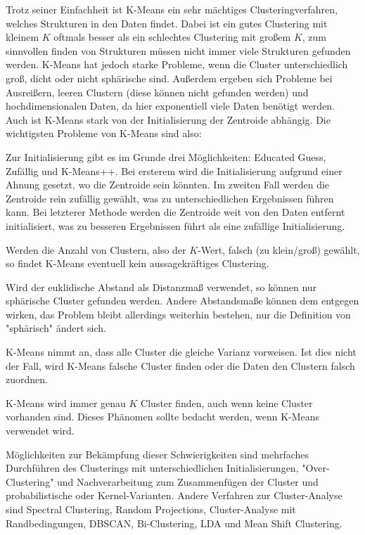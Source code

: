 		Trotz seiner Einfachheit ist K-Means ein sehr mächtiges Clusteringverfahren, welches Strukturen in den Daten findet. Dabei ist ein gutes Clustering mit kleinem \(K\) oftmals besser als ein schlechtes Clustering mit großem \(K\), \dh zum sinnvollen finden von Strukturen müssen nicht immer viele Strukturen gefunden werden. K-Means hat jedoch starke Probleme, wenn die Cluster unterschiedlich groß, dicht oder nicht sphärische sind. Außerdem ergeben sich Probleme bei Ausreißern, leeren Clustern (diese können nicht gefunden werden) und hochdimensionalen Daten, da hier exponentiell viele Daten benötigt werden. Auch ist K-Means stark von der Initialisierung der Zentroide abhängig. Die wichtigsten Probleme von K-Means sind also:
		\begin{description}[leftmargin = 6cm]
			\item[Initialisierung]
				Zur Initialisierung gibt es im Grunde drei Möglichkeiten: Educated Guess, Zufällig und K-Means++. Bei ersterem wird die Initialisierung aufgrund einer Ahnung gesetzt, wo die Zentroide sein könnten. Im zweiten Fall werden die Zentroide rein zufällig gewählt, was zu unterschiedlichen Ergebnissen führen kann. Bei letzterer Methode werden die Zentroide weit von den Daten entfernt initialisiert, was zu besseren Ergebnissen führt als eine zufällige Initialisierung.
			\item[Clusteranzahl]
				Werden die Anzahl von Clustern, also der \(K\)-Wert, falsch (zu klein/groß) gewählt, so findet K-Means eventuell kein aussagekräftiges Clustering.
			\item[Nicht-sphärische Cluster]
				Wird der euklidische Abstand als Distanzmaß verwendet, so können nur sphärische Cluster gefunden werden. Andere Abstandsmaße können dem entgegen wirken, das Problem bleibt allerdings weiterhin bestehen, nur die Definition von "sphärisch" ändert sich.
			\item[Cluster mit ungleicher Varianz]
				K-Means nimmt an, dass alle Cluster die gleiche Varianz vorweisen. Ist dies nicht der Fall, wird K-Means falsche Cluster finden oder die Daten den Clustern falsch zuordnen.
			\item[Erzwungene Clusterbildung]
				K-Means wird immer genau \(K\) Cluster finden, auch wenn keine Cluster vorhanden sind. Dieses Phänomen sollte bedacht werden, wenn K-Means verwendet wird.
		\end{description}
		Möglichkeiten zur Bekämpfung dieser Schwierigkeiten sind \zB mehrfaches Durchführen des Clusterings mit unterschiedlichen Initialisierungen, "Over-Clustering" und Nachverarbeitung zum Zusammenfügen der Cluster und probabilistische oder Kernel-Varianten. Andere Verfahren zur Cluster-Analyse sind \zB Spectral Clustering, Random Projections, Cluster-Analyse mit Randbedingungen, DBSCAN, Bi-Clustering, LDA und Mean Shift Clustering.

